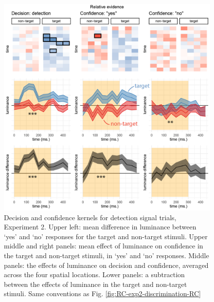 \documentclass[12pt,twoside]{reedthesis}
\begin{document}
\begin{figure}
\includegraphics[width=\textwidth]{figure/RC/RC-exp2-signal-RC-enhanced} \caption[Decision kernels in detection signal trials, Exp. 2]{Decision and confidence kernels for detection signal trials, Experiment 2. Upper left: mean difference in luminance between `yes' and `no' responses for the target and non-target stimuli. Upper middle and right panels: mean effect of luminance on confidence in the target and non-target stimuli, in `yes' and `no' responses. Middle panels: the effects of luminance on decision and confidence, averaged across the four spatial locations. Lower panels: a subtraction between the effects of luminance in the target and non-target stimuli. Same conventions as Fig. \ref{fig:RC-exp2-discrimination-RC}}\label{fig:RC-exp2-signal-RC}
\end{figure}
\end{document}
